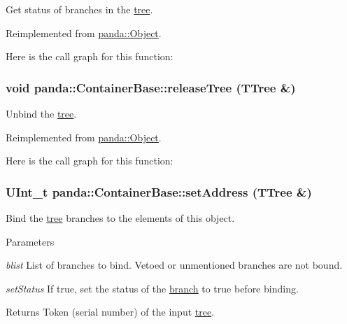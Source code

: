 Get status of branches in the \hyperlink{namespacepanda_1_1tree}{tree}. 

Reimplemented from \hyperlink{classpanda_1_1Object_ad575503e839f7aa6cc47434b3a24cb80}{panda::Object}.

Here is the call graph for this function:\hypertarget{classpanda_1_1ContainerBase_a5e646fde2bfb6e9650d2e3db5c80a349}{
\subsubsection[{releaseTree}]{\setlength{\rightskip}{0pt plus 5cm}void panda::ContainerBase::releaseTree (TTree \&)}}
\label{classpanda_1_1ContainerBase_a5e646fde2bfb6e9650d2e3db5c80a349}


Unbind the \hyperlink{namespacepanda_1_1tree}{tree}. 

Reimplemented from \hyperlink{classpanda_1_1Object_aaf58438092b42a89b838ce12c6a23833}{panda::Object}.

Here is the call graph for this function:\hypertarget{classpanda_1_1ContainerBase_ad5fdf0c76a93e2c5ae563ad34b268e43}{
\subsubsection[{setAddress}]{\setlength{\rightskip}{0pt plus 5cm}UInt\_\-t panda::ContainerBase::setAddress (TTree \&)}}
\label{classpanda_1_1ContainerBase_ad5fdf0c76a93e2c5ae563ad34b268e43}


Bind the \hyperlink{namespacepanda_1_1tree}{tree} branches to the elements of this object. 
\begin{DoxyParams}{Parameters}
\item[{\em blist}]List of branches to bind. Vetoed or unmentioned branches are not bound. \item[{\em setStatus}]If true, set the status of the \hyperlink{namespacepanda_1_1branch}{branch} to true before binding. \end{DoxyParams}
\begin{DoxyReturn}{Returns}
Token (serial number) of the input \hyperlink{namespacepanda_1_1tree}{tree}. 
\end{DoxyReturn}


